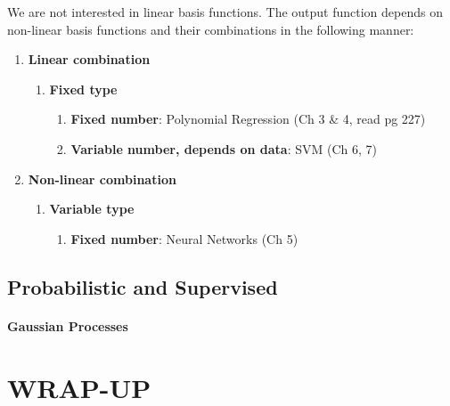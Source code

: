 \documentclass{book}
\begin{document}
We are not interested in linear basis functions.
The output function depends on non-linear basis functions and their combinations in the following manner:

\begin{enumerate}
\item {\color{red}\textbf{Linear combination}}
\begin{enumerate}
\item {\color{OliveGreen}\textbf{Fixed type}}
\begin{enumerate}
\item {\color{blue}\textbf{Fixed number}}: Polynomial Regression (Ch 3 \& 4, read pg 227) 
\item {\color{blue}\textbf{Variable number, depends on data}}: SVM (Ch 6, 7)
\end{enumerate}
\end{enumerate}
\item {\color{red}\textbf{Non-linear combination}}
\begin{enumerate}
\item {\color{OliveGreen}\textbf{Variable type}}
\begin{enumerate}
\item {\color{blue}\textbf{Fixed number}}: Neural Networks (Ch 5)
\end{enumerate}
\end{enumerate}
\end{enumerate}






\chapter{Probabilistic and Supervised}

\subsection{Gaussian Processes}

\part{\color{red}WRAP-UP}
\cite{GaussProc_SimpleIntro}
\cite{BOOK_GMPL}



\nocite{*}
\printbibheading[title={Bibliography},heading=bibnumbered]
\printbibliography[title={Books},type=book,heading=subbibnumbered]
\printbibliography[title={Articles},type=article,heading=subbibnumbered]
\printbibliography[title={Web Pages},type=misc,heading=subbibnumbered]
\printindex
\end{document}
